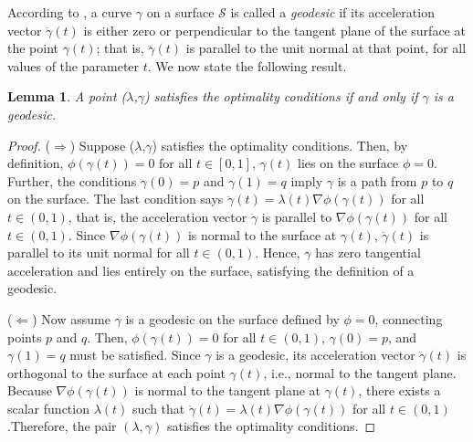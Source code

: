 \documentclass[12pt]{amsart}
\newtheorem{lemma}[theorem]{Lemma}
\theoremstyle{definition}
\theoremstyle{remark}
\numberwithin{equation}{section}
\numberwithin{equation}{section}
\begin{document}
According to \cite[Definition 9.1.1]{Pressley:2001},  a curve $\gamma$ on a surface $\mathcal{S}$ is called a \textit{geodesic} if its acceleration vector $\ddot{\gamma}(t)$ is either zero or perpendicular to the tangent plane of the surface at the point $\gamma(t)$; that is, $\ddot{\gamma}(t)$ is parallel to the unit normal at that point, for all values of the parameter $t$. We now state the following result. 
\begin{lemma}
   A point ($\lambda$,$\gamma$) satisfies the optimality conditions if and only if $\gamma$ is a geodesic.
\end{lemma}
\begin{proof}
($\Rightarrow$) Suppose ($\lambda$,$\gamma$) satisfies the optimality conditions.
Then, by definition,  $\phi(\gamma(t)) = 0$ for all $t\in [0,1]$,  $\gamma(t)$ lies on the surface $\phi=0$. Further, the conditions $\gamma(0) = p$ and $\gamma(1) = q$ imply $\gamma$ is a path from $p$ to $q$ on the surface. The last condition says $\ddot{\gamma}(t)=\lambda(t)\nabla\phi(\gamma(t))$ for all $t\in(0, 1)$, that is, the acceleration vector $\ddot{\gamma}$ is parallel to $\nabla\phi(\gamma(t))$ for all $t\in (0,1)$. Since $\nabla\phi(\gamma(t))$ is normal to the surface at  $\gamma(t)$, $\ddot{\gamma}(t)$ is parallel to its unit normal for all $t\in (0,1)$.
Hence, $\gamma$ has zero tangential acceleration and lies entirely on the surface, satisfying the definition of a geodesic.

($\Leftarrow$) Now assume $\gamma$ is a geodesic on the surface defined by $\phi=0$, connecting points $p$ and $q$. 
Then, $\phi(\gamma(t)) = 0$ for all $t\in (0, 1)$, $\gamma(0)= p$, and $\gamma(1) = q$ must be satisfied. Since $\gamma$ is a geodesic, its acceleration vector  $\ddot{\gamma}(t)$ is orthogonal to the surface at each point $\gamma(t)$, i.e., normal to the tangent plane. Because $\nabla\phi(\gamma(t))$ is normal to the tangent plane at $\gamma(t)$, there exists a scalar function $\lambda(t)$ such that  $\ddot{\gamma}(t) = \lambda(t)\nabla\phi(\gamma(t))$ for all $t\in (0,1)$.Therefore, the pair $(\lambda, \gamma)$ satisfies the optimality conditions. 
\end{proof}
\end{document}
